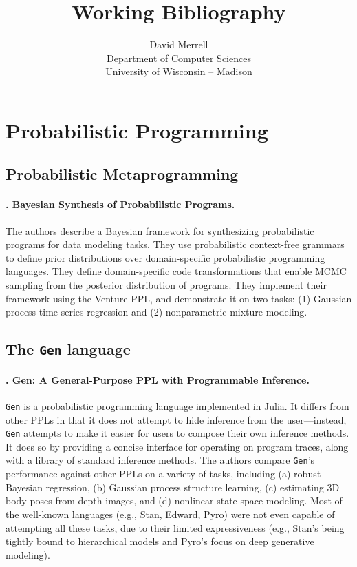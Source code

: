 \documentclass[14pt]{article}
\date{}
\begin{document}
\title{Working Bibliography}

\author{David Merrell \\ Department of Computer Sciences \\ University of Wisconsin -- Madison}

\maketitle{}

\thispagestyle{empty}

\section{Probabilistic Programming}

\subsection{Probabilistic Metaprogramming}

\paragraph{\citet{saad-synthesis-2019}. Bayesian Synthesis of Probabilistic Programs.}
The authors describe a Bayesian framework for synthesizing probabilistic programs for data modeling tasks.
They use probabilistic context-free grammars to define prior distributions over domain-specific probabilistic programming languages.
They define domain-specific code transformations that enable MCMC sampling from the posterior distribution of programs.
They implement their framework using the Venture PPL, and demonstrate it on two tasks: (1) Gaussian process time-series regression and (2) nonparametric mixture modeling. 

\subsection{The \texttt{Gen} language}

\paragraph{\citet{cusumano-gen-2018}. Gen: A General-Purpose PPL with Programmable Inference.}
\texttt{Gen} is a probabilistic programming language implemented in Julia.
It differs from other PPLs in that it does not attempt to hide inference from the user---instead,
\texttt{Gen} attempts to make it easier for users to compose their own inference methods.
It does so by providing a concise interface for operating on program traces, along with a library of standard inference methods.
The authors compare \texttt{Gen}'s performance against other PPLs on a variety of tasks, including (a) robust Bayesian regression, (b) Gaussian process structure learning, (c) estimating 3D body poses from depth images, and (d) nonlinear state-space modeling.
Most of the well-known languages (e.g., Stan, Edward, Pyro) were not even capable of attempting all these tasks, due to their limited expressiveness (e.g., Stan's being tightly bound to hierarchical models and Pyro's focus on deep generative modeling). 
\end{document}

